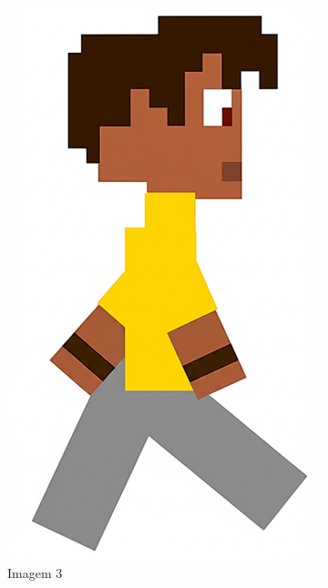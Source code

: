 \begin{figure}[htbp]
\begin{subfigure}{0.23\linewidth}
        \includegraphics[width=1\linewidth]{figs/geminiPro/chat10/tela1_res2_3.PNG}
        \caption{\small Imagem 3}
        \label{fig:geminiProSheet5_2c}
    \end{subfigure}
    \begin{subfigure}{0.23\linewidth}

\end{subfigure}
\end{figure}
